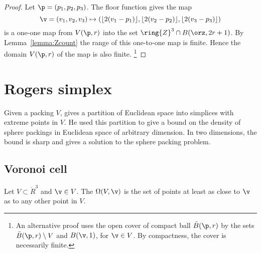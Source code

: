 \begin{proof}  Let $\p = (p_1,p_2,p_3)$. The floor function gives the map
\begin{displaymath}\v=(v_1,v_2,v_3)\mapsto (\lfloor 2(v_1-p_1)
  \rfloor, \lfloor 2(v_2-p_2) \rfloor, \lfloor 2(v_3-p_3) \rfloor)\end{displaymath}
is a one-one map from $ V(\p,r)$ into the set $\ring{Z}^3\cap B(\orz,2r + 1)$.  
By Lemma~\ref{lemma:Zcount} the range of this one-to-one map is finite. 
Hence the domain $ V(\p,r)$ of the map is also finite.%
\footnote{An alternative proof uses the open cover of compact ball 
$\bar B(\p,r)$ by the sets $\bar B(\p,r)\setminus V$ and $B(\v,1)$, 
for $\v\in V$. By compactness, the cover is necessarily finite.}
\end{proof}
%




\section{Rogers simplex}\label{sec:rogers}





Given a packing $ V$, \cite{Rogers:1958:Packing} gives a partition of
Euclidean space into simplices with extreme points in $ V$.  He used
this partition to give a bound on the density of sphere packings in
Euclidean space of arbitrary dimension.  In two dimensions, the bound
is sharp and gives a solution to the sphere packing problem.


\subsection{Voronoi cell}

\begin{definition}\label{def:voronoi} 
Let $V\subset\ring{R}^3$ and $\v\in V$.
The  
$\Omega(V,\v)$
is the set of points at least as close to $\v$ as to
any other point in $V$. 
\end{definition}

